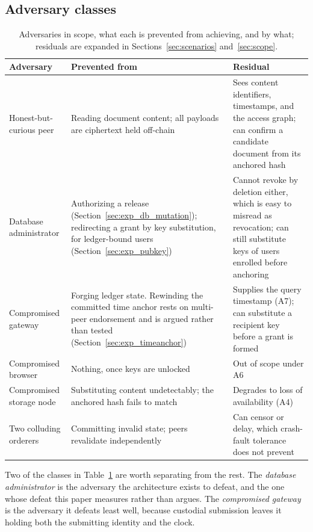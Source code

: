 \documentclass[preprint,12pt]{elsarticle}
\begin{document}
\subsection{Adversary classes}
\label{sec:adversaries}

\begin{table}[!t]
\centering
\caption{Adversaries in scope, what each is prevented from achieving, and by
what; residuals are expanded in Sections~\ref{sec:scenarios}
and~\ref{sec:scope}.}
\label{tab:adversaries}
\footnotesize
\setlength{\tabcolsep}{4pt}
\begin{tabular}{@{}>{\raggedright\arraybackslash}p{}%
                 >{\raggedright\arraybackslash}p{}%
                 >{\raggedright\arraybackslash}p{}@{}}
\toprule
Adversary & Prevented from & Residual \\
\midrule
Honest-but-curious peer &
Reading document content; all payloads are ciphertext held off-chain &
Sees content identifiers, timestamps, and the access graph; can confirm a
candidate document from its anchored hash \\
Database administrator &
Authorizing a release (Section~\ref{sec:exp_db_mutation}); redirecting a grant
by key substitution, for ledger-bound users
(Section~\ref{sec:exp_pubkey}) &
Cannot revoke by deletion either, which is easy to misread as revocation; can
still substitute keys of users enrolled before anchoring \\
Compromised gateway &
Forging ledger state. Rewinding the committed time anchor rests on multi-peer
endorsement and is argued rather than tested
(Section~\ref{sec:exp_timeanchor}) &
Supplies the query timestamp (A7); can substitute a recipient key before a
grant is formed \\
Compromised browser &
Nothing, once keys are unlocked &
Out of scope under A6 \\
Compromised storage node &
Substituting content undetectably; the anchored hash fails to match &
Degrades to loss of availability (A4) \\
Two colluding orderers &
Committing invalid state; peers revalidate independently &
Can censor or delay, which crash-fault tolerance does not prevent \\
\bottomrule
\end{tabular}
\end{table}

Two of the classes in Table~\ref{tab:adversaries} are worth separating from the
rest. The \emph{database administrator} is the adversary the architecture exists
to defeat, and the one whose defeat this paper measures rather than argues. The
\emph{compromised gateway} is the adversary it defeats least well, because
custodial submission leaves it holding both the submitting identity and the
clock.
\end{document}
